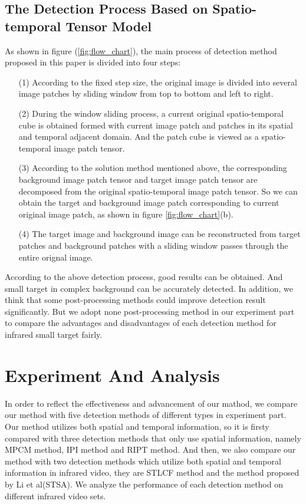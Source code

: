 \documentclass[journal]{IEEEtran}
\begin{document}
\subsection{The Detection Process Based on Spatio-temporal Tensor Model}
As shown in figure (\ref{fig:flow_chart}), the main process of detection method proposed in this paper is divided into four steps:
\begin{itemize}
  \item [(1)]According to the fixed step size, the original image is divided into several image patches by sliding window from top to bottom and left to right.
  \item [(2)]During the window sliding process, a current original spatio-temporal cube is obtained formed with current image patch and patches in its spatial and temporal adjacent domain. And the patch cube is viewed as a spatio-temporal image patch tensor.
  \item [(3)]According to the solution method mentioned above, the corresponding background image patch tensor and target image patch tensor are decomposed from the original spatio-temporal image patch tensor. So we can obtain the target and background image patch corresponding to current original image patch, as shown in figure \ref{fig:flow_chart}(b).
  \item [(4)]The target image and background image can be reconstructed from target patches and background patches with a sliding window passes through the entire orignal image.
\end{itemize}

According to the above detection process, good results can be obtained. And small target in complex background can be accurately detected. In addition, we think that some post-processing methods could improve detection result significantly. But we adopt none post-processing method in our experiment part to compare the advantages and disadvantages of each detection method for infrared small target fairly.


\section{Experiment And Analysis}
In order to reflect the effectiveness and advancement of our mathod, we compare our method with five detection methods of different types in experiment part. Our method utilizes both spatial and temporal information, so it is firsty compared with three detection methods that only use spatial information, namely MPCM method\cite{wei2016multiscale}, IPI method\cite{gao2013infrared} and RIPT method\cite{dai2017reweighted}. And then, we also compare our method with two detection methods which utilize both spatial and temporal information in infrared video, they are STLCF method\cite{deng2016infrared} and the method proposed by Li et al\cite{li2016novel}(STSA). We analyze the performance of each detection method on different infrared video sets.
\end{document}
